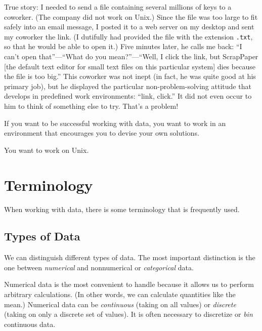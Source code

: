 \begin{unnumlist}
True story: I needed to send a file containing several millions of
keys to a coworker. (The company did not work on Unix.) Since the file
was too large to fit safely into an email message, I posted it to a
web server on my desktop and sent my coworker the link. (I dutifully
had provided the file with the extension \texttt{.txt}, so that he
would be able to open it.) Five minutes later, he calls me back: ``I
can't open that''---``What do you mean?''---``Well, I click the link,
but ScrapPaper\vadjust{\pagebreak} [the default text editor for small text files on this
particular system] dies because the file is too big.''  This  coworker
was not inept (in fact, he was quite good at his primary job), but he
displayed the particular non-problem-solving attitude that develops in
predefined work environments: ``link, click.'' It did not even occur
to him to think of something else to try. That's a problem!\vspace*{6pt}

If you want to be successful working with data, you want to work in an
environment that encourages you to devise your own solutions.\vspace*{6pt}

You want to work on Unix.
\end{unnumlist}  

\vspace*{-6pt}
\section{Terminology}


When working with data, there is some terminology that is frequently
used.

\vspace*{-6pt}
\subsection{Types of Data}

We can distinguish different types of data. The most important
distinction is the one between \emph{numerical} and nonnumerical or
\emph{categorical} data. 

Numerical data  is the most convenient to handle because it allows us
to perform arbitrary calculations. (In other words, we can calculate
quantities like the mean.) Numerical data can be \emph{continuous}
(taking on all values) or \emph{discrete} (taking on only a discrete
set of values). It is often necessary to discretize or \emph{bin}
continuous data.

